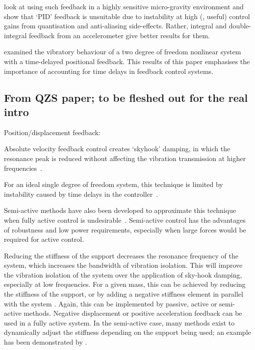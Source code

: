 \textcite{zhu2006} look at using such feedback in a highly sensitive
micro-gravity environment and show that `PID' feedback is unsuitable due to
instability at high (\ie, useful) control gains from quantisation and
anti-aliasing side-effects.
Rather, integral and double-integral feedback from
an accelerometer give better results for them.

\textcite{zhao2007} examined the vibratory behaviour of a two degree of
freedom nonlinear system with a time-delayed positional feedback.
This results
of this paper emphasises the importance of accounting for time delays in
feedback control systems.

\subsection{From QZS paper; to be fleshed out for the real intro}

Position/displacement feedback: \cite{mahmoodi2009}

Absolute velocity feedback control creates `skyhook' damping, in which the resonance peak is reduced without affecting the vibration transmission at higher frequencies~\cite{yan2006}.

For an ideal single degree of freedom system, this technique is limited by instability caused by time delays in the controller~\cite{ananthaganeshan2001,elliott2004,brennan2007}.

Semi-active methods have also been developed to approximate this technique when fully active control is undesirable~\cite{liu2002,liu2005,ahmadian2004}.
Semi-active control has the advantages of robustness and low power requirements, especially when large forces would be required for active control.

Reducing the stiffness of the support decreases the resonance frequency of the system, which increases the bandwidth of vibration isolation.
This will improve the vibration isolation of the system over the application of sky-hook damping, especially at low frequencies.
For a given mass, this can be achieved by reducing the stiffness of the support, or by adding a negative stiffness element in parallel with the system \cite{lee2007,xing2005}.
Again, this can be implemented by passive, active or semi-active methods.
Negative displacement or positive acceleration feedback can be used in a fully active system.
In the semi-active case, many methods exist to dynamically adjust the stiffness depending on the support being used; an example has been demonstrated by \textcite{kidner2002,liu2006a}.

